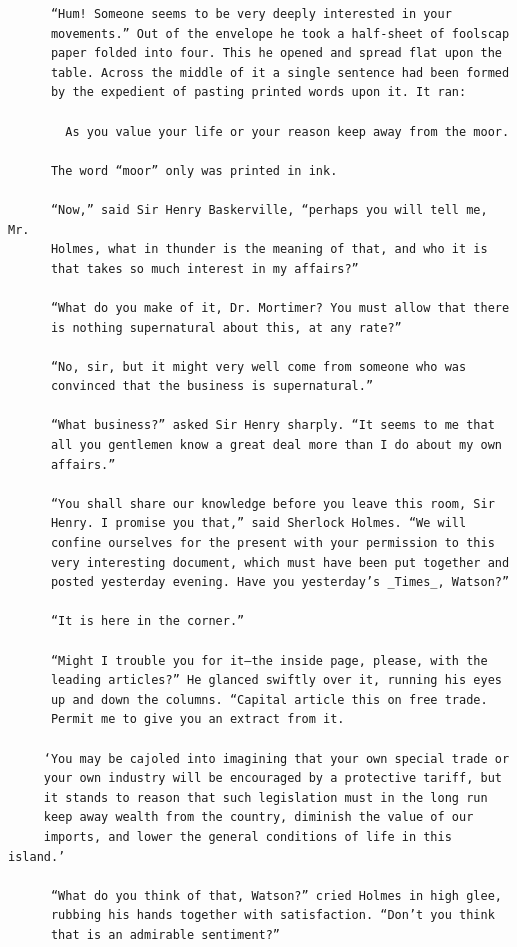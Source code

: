 \documentclass{article}
\begin{document}
\begin{verbatim}
      “Hum! Someone seems to be very deeply interested in your
      movements.” Out of the envelope he took a half-sheet of foolscap
      paper folded into four. This he opened and spread flat upon the
      table. Across the middle of it a single sentence had been formed
      by the expedient of pasting printed words upon it. It ran:

        As you value your life or your reason keep away from the moor.

      The word “moor” only was printed in ink.

      “Now,” said Sir Henry Baskerville, “perhaps you will tell me, Mr.
      Holmes, what in thunder is the meaning of that, and who it is
      that takes so much interest in my affairs?”

      “What do you make of it, Dr. Mortimer? You must allow that there
      is nothing supernatural about this, at any rate?”

      “No, sir, but it might very well come from someone who was
      convinced that the business is supernatural.”

      “What business?” asked Sir Henry sharply. “It seems to me that
      all you gentlemen know a great deal more than I do about my own
      affairs.”

      “You shall share our knowledge before you leave this room, Sir
      Henry. I promise you that,” said Sherlock Holmes. “We will
      confine ourselves for the present with your permission to this
      very interesting document, which must have been put together and
      posted yesterday evening. Have you yesterday’s _Times_, Watson?”

      “It is here in the corner.”

      “Might I trouble you for it—the inside page, please, with the
      leading articles?” He glanced swiftly over it, running his eyes
      up and down the columns. “Capital article this on free trade.
      Permit me to give you an extract from it.

     ‘You may be cajoled into imagining that your own special trade or
     your own industry will be encouraged by a protective tariff, but
     it stands to reason that such legislation must in the long run
     keep away wealth from the country, diminish the value of our
     imports, and lower the general conditions of life in this island.’

      “What do you think of that, Watson?” cried Holmes in high glee,
      rubbing his hands together with satisfaction. “Don’t you think
      that is an admirable sentiment?”


\end{verbatim}
\end{document}
